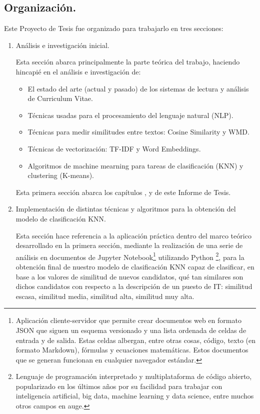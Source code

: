 \documentclass[12pt,a4paper]{article}
\begin{document}
\begin{sloppypar}
\subsection{Organización.}
Este Proyecto de Tesis fue organizado para trabajarlo en tres secciones:

\begin{enumerate}
\item Análisis e investigación inicial. 

Esta sección abarca principalmente la parte teórica del trabajo, haciendo hincapié en el análisis e investigación de:
\begin{itemize}
	\item El estado del arte (actual y pasado) de los sistemas de lectura y análisis de Curriculum Vitae.
	\item Técnicas usadas para el procesamiento del lenguaje natural (NLP).
	\item Técnicas para medir similitudes entre textos: Cosine Similarity y WMD.
	\item Técnicas de vectorización: TF-IDF y Word Embeddings.
	\item Algoritmos de machine mearning para tareas de clasificación (KNN) y clustering (K-means).
\end{itemize} 

Esta primera sección abarca los capítulos \textit{}, \textit{} y \textit{} de este Informe de Tesis. \\

\item Implementación de distintas técnicas y algoritmos para la obtención del modelo de clasificación KNN. 

Esta sección hace referencia a la aplicación práctica dentro del marco teórico desarrollado en la primera sección, mediante la realización de una serie de análisis en documentos de Jupyter Notebook\footnote{Aplicación cliente-servidor que permite crear documentos web en formato JSON que siguen un esquema versionado y una lista ordenada de celdas de entrada y de salida. Estas celdas albergan, entre otras cosas, código, texto (en formato Markdown), fórmulas y ecuaciones matemáticas. Estos documentos que se generan funcionan en cualquier navegador estándar.} utilizando Python \footnote{Lenguaje de programación interpretado y multiplataforma de código abierto, popularizado en los últimos años por su facilidad para trabajar con inteligencia artificial, big data, machine learning y data science, entre muchos otros campos en auge.}, para la obtención final de nuestro modelo de clasificación KNN capaz de clasificar, en base a los valores de similitud de nuevos candidatos, qué tan similares son dichos candidatos con respecto a la descripción de un puesto de IT: similitud escasa, similitud media, similitud alta, similitud muy alta. 


\end{enumerate}
\end{sloppypar}
\end{document}
